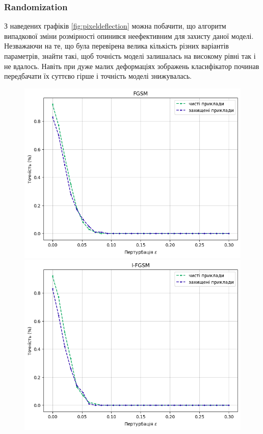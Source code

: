 \documentclass[a4paper,14pt]{extreport}
\begin{document}
	\subsubsection{Randomization}
	\noindent
	З наведених графіків \ref{fig:pixeldeflection} можна побачити, що алгоритм випадкової зміни розмірності опинився неефективним для захисту даної моделі. Незважаючи на те, що була перевірена велика кількість різних варіантів параметрів, знайти такі, щоб точність моделі залишалась на високому рівні так і не вдалось. Навіть при дуже малих деформаціях зображень класифікатор починав передбачати їх суттєво гірше і точність моделі знижувалась.
	\begin{figure}[!htb]
		\includegraphics[width=1\textwidth]{resources/fgsm_rand_defence.png}
		\endminipage\hfill
		\includegraphics[width=1\textwidth]{resources/ifgsm_rand_defence.png}

\end{figure}
\end{document}
